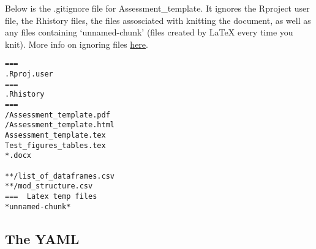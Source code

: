 \documentclass[12pt,]{article}
\begin{document}
Below is the .gitignore file for Assessment\_template. It ignores the
Rproject user file, the Rhistory files, the files assosciated with
knitting the document, as well as any files containing `unnamed-chunk'
(files created by LaTeX every time you knit). More info on ignoring
files \href{http://git-scm.com/docs/gitignore}{here}.

\begin{Verbatim}[frame=single]
===  
.Rproj.user 
===   
.Rhistory  
===   
/Assessment_template.pdf
/Assessment_template.html
Assessment_template.tex
Test_figures_tables.tex
*.docx

**/list_of_dataframes.csv
**/mod_structure.csv
===  Latex temp files  
*unnamed-chunk*
\end{Verbatim}

\newpage

\subsection{The YAML}\label{the-yaml}
\end{document}
